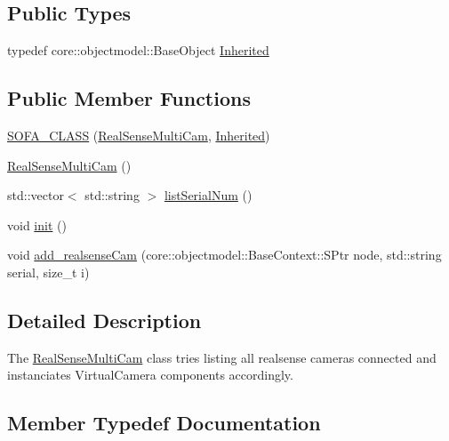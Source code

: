 \subsection*{Public Types}
\begin{DoxyCompactItemize}
\item 
typedef core\+::objectmodel\+::\+Base\+Object \hyperlink{classsofa_1_1rgbdtracking_1_1_real_sense_multi_cam_ac46918355916b1af92c7aabc7e244e39}{Inherited}
\end{DoxyCompactItemize}
\subsection*{Public Member Functions}
\begin{DoxyCompactItemize}
\item 
\hyperlink{classsofa_1_1rgbdtracking_1_1_real_sense_multi_cam_a580a759696c9de476a75c1aabc955669}{S\+O\+F\+A\+\_\+\+C\+L\+A\+SS} (\hyperlink{classsofa_1_1rgbdtracking_1_1_real_sense_multi_cam}{Real\+Sense\+Multi\+Cam}, \hyperlink{classsofa_1_1rgbdtracking_1_1_real_sense_multi_cam_ac46918355916b1af92c7aabc7e244e39}{Inherited})
\item 
\hyperlink{classsofa_1_1rgbdtracking_1_1_real_sense_multi_cam_a7f9c9f94849adee3e90212159b635396}{Real\+Sense\+Multi\+Cam} ()
\item 
std\+::vector$<$ std\+::string $>$ \hyperlink{classsofa_1_1rgbdtracking_1_1_real_sense_multi_cam_ae06084e54a01de953a441b1994ad22e7}{list\+Serial\+Num} ()
\item 
void \hyperlink{classsofa_1_1rgbdtracking_1_1_real_sense_multi_cam_ac93ba93ba4d82475f37e4300173b168d}{init} ()
\item 
void \hyperlink{classsofa_1_1rgbdtracking_1_1_real_sense_multi_cam_a1aea376ebf5a7ee03af4cae251380e89}{add\+\_\+realsense\+Cam} (core\+::objectmodel\+::\+Base\+Context\+::\+S\+Ptr node, std\+::string serial, size\+\_\+t i)
\end{DoxyCompactItemize}


\subsection{Detailed Description}
The \hyperlink{classsofa_1_1rgbdtracking_1_1_real_sense_multi_cam}{Real\+Sense\+Multi\+Cam} class tries listing all realsense cameras connected and instanciates Virtual\+Camera components accordingly. 

\subsection{Member Typedef Documentation}
\mbox{\label{classsofa_1_1rgbdtracking_1_1_real_sense_multi_cam_ac46918355916b1af92c7aabc7e244e39}} 
